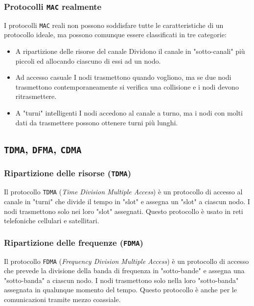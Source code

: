         \subsubsection{Protocolli \texttt{MAC} realmente}
            I protocolli \texttt{MAC} reali non possono soddisfare tutte le caratteristiche di un protocollo ideale, ma possono comunque essere classificati in tre categorie:
            \begin{itemize}
                \item A ripartizione delle risorse del canale
                    \subitem Dividono il canale in "sotto-canali" più piccoli ed allocando ciascuno di essi ad un nodo.
                \item Ad accesso casuale
                    \subitem I nodi trasmettono quando vogliono, ma se due nodi trasmettono contemporaneamente si verifica una collisione e i nodi devono ritrasmettere.
                \item A "turni" intelligenti
                    \subitem I nodi accedono al canale a turno, ma i nodi con molti dati da trasmettere possono ottenere turni più lunghi.
            \end{itemize}
    \subsection{\texttt{TDMA}, \texttt{DFMA}, \texttt{CDMA}}
        \subsubsection{Ripartizione delle risorse (\texttt{TDMA})}
            Il protocollo \texttt{TDMA} (\textit{Time Division Multiple Access}) è un protocollo di accesso al canale in "turni" che divide il tempo in "slot" e assegna un "slot" a ciascun nodo. I nodi trasmettono solo nei loro "slot" assegnati. Questo protocollo è usato in reti telefoniche cellulari e satellitari.
        \subsubsection{Ripartizione delle frequenze (\texttt{FDMA})}
            Il protocollo \texttt{FDMA} (\textit{Frequency Division Multiple Access}) è un protocollo di accesso che prevede la divisione della banda di frequenza in "sotto-bande" e assegna una "sotto-banda" a ciascun nodo. I nodi trasmettono solo nella loro "sotto-banda" assegnata in qualunque momento del tempo. Questo protocollo è anche per le comunicazioni tramite mezzo coassiale.
